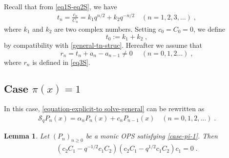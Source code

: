 \documentclass{amsart}
\newtheorem{lemma}[theorem]{Lemma}
\theoremstyle{remark}
\numberwithin{equation}{section}
\begin{document}
Recall that from \eqref{eq1S-eq2S}, we have 
\begin{align}\label{general-tn-struc}
t_n = \frac{c_n}{C_n} =k_1 q^{n/2}+k_2q^{-n/2}\quad (n=1,2,3,\ldots)\;,
\end{align} 
where $k_1$ and $k_2$ are two complex numbers. Setting $c_0=C_0=0$, we define $$t_0:=k_1+k_2\;,$$ by compatibility with \eqref{general-tn-struc}. Hereafter we assume that $$r_n=t_n+a_n-a_{n-1}\neq 0\;\quad (n=0,1,2\ldots)\;,$$ where $r_n$ is defined in \eqref{eq3S}.


\subsection{Case $\pi(x)=1$}
In this case, \eqref{equation-explicit-to solve-general} can be rewritten as
\begin{align}
\mathcal{S}_q P_n(x)=\alpha_nP_n(x)+c_nP_{n-1}(x)\quad (n=0,1,2,\ldots)\;. \label{case-pi-1}
\end{align}  
  
\begin{lemma}\label{uniqueness-case-1}
Let $(P_n)_{n\geq0}$ be a monic OPS satisfying \eqref{case-pi-1}. Then 
\begin{align}
\left( c_2 C_1-q^{-1/2}c_1C_2\right) \left(c_2C_1-q^{1/2}c_1C_2\right)c_1  = 0\;. \label{uniqueness-cond-case-1}
\end{align}
\end{lemma}
\end{document}
